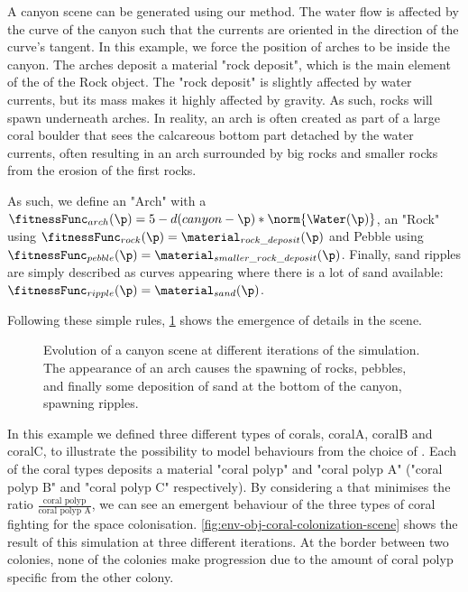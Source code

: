 A canyon scene can be generated using our method. The water flow is affected by the curve of the canyon such that the currents are oriented in the direction of the curve's tangent. In this example, we force the position of arches to be inside the canyon. The arches deposit a material "rock deposit", which is the main element of the  of the Rock object. The "rock deposit" is slightly affected by water currents, but its mass makes it highly affected by gravity. As such, rocks will spawn underneath arches. In reality, an arch is often created as part of a large coral boulder that sees the calcareous bottom part detached by the water currents, often resulting in an arch surrounded by big rocks and smaller rocks from the erosion of the first rocks.

As such, we define an  "Arch" with a  $\fitnessFunc_{arch}(\p) = 5 - d(canyon - \p) * \norm{\Water(\p)}$, an  "Rock" using $\fitnessFunc_{rock}(\p) = \material_{rock\_deposit}(\p)$ and Pebble using $\fitnessFunc_{pebble}(\p) = \material_{smaller\_rock\_deposit}(\p)$. Finally, sand ripples are simply described as curves appearing where there is a lot of sand available: $\fitnessFunc_{ripple}(\p) = \material_{sand}(\p)$.

Following these simple rules, \cref{fig:env-obj-canyon-scene} shows the emergence of details in the scene.

\begin{figure}
    \caption{Evolution of a canyon scene at different iterations of the simulation. The appearance of an arch causes the spawning of rocks, pebbles, and finally some deposition of sand at the bottom of the canyon, spawning ripples.}
    \label{fig:env-obj-canyon-scene}
\end{figure}

In this example we defined three different types of corals, coralA, coralB and coralC, to illustrate the possibility to model behaviours from the choice of . Each of the coral types deposits a material "coral polyp" and "coral polyp A" ("coral polyp B" and "coral polyp C" respectively). By considering a  that minimises the ratio $\frac{\text{coral polyp}}{\text{coral polyp A}}$, we can see an emergent behaviour of the three types of coral fighting for the space colonisation.
\cref{fig:env-obj-coral-colonization-scene} shows the result of this simulation at three different iterations. At the border between two colonies, none of the colonies make progression due to the amount of coral polyp specific from the other colony.

